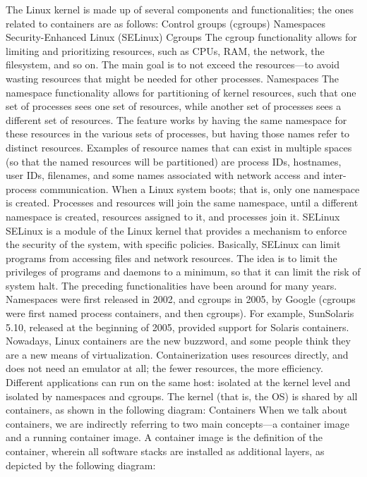 The Linux kernel is made up of several components and functionalities; the ones related to
containers are as follows:
Control groups (cgroups)
Namespaces
Security-Enhanced Linux (SELinux)
Cgroups
The cgroup functionality allows for limiting and prioritizing resources, such as CPUs,
RAM, the network, the filesystem, and so on. The main goal is to not exceed the
resources—to avoid wasting resources that might be needed for other processes.
Namespaces
The namespace functionality allows for partitioning of kernel resources, such that one set of
processes sees one set of resources, while another set of processes sees a different set of
resources. The feature works by having the same namespace for these resources in the
various sets of processes, but having those names refer to distinct resources. Examples of
resource names that can exist in multiple spaces (so that the named resources will be
partitioned) are process IDs, hostnames, user IDs, filenames, and some names associated
with network access and inter-process communication.
When a Linux system boots; that is, only one namespace is created. Processes and resources
will join the same namespace, until a different namespace is created, resources assigned to
it, and processes join it.
SELinux
SELinux is a module of the Linux kernel that provides a mechanism to enforce the security
of the system, with specific policies.
Basically, SELinux can limit programs from accessing files and network resources. The idea
is to limit the privileges of programs and daemons to a minimum, so that it can limit the
risk of system halt.
The preceding functionalities have been around for many years. Namespaces were first
released in 2002, and cgroups in 2005, by Google (cgroups were first named process
containers, and then cgroups). For example, SunSolaris 5.10, released at the beginning of
2005, provided support for Solaris containers.
Nowadays, Linux containers are the new buzzword, and some people think they are a
new means of virtualization.
Containerization uses resources directly, and does not need an emulator at all; the fewer
resources, the more efficiency. Different applications can run on the same host: isolated at
the kernel level and isolated by namespaces and cgroups. The kernel (that is, the OS) is
shared by all containers, as shown in the following diagram:
Containers
When we talk about containers, we are indirectly referring to two main concepts—a
container image and a running container image.
A container image is the definition of the container, wherein all software stacks are
installed as additional layers, as depicted by the following diagram:

